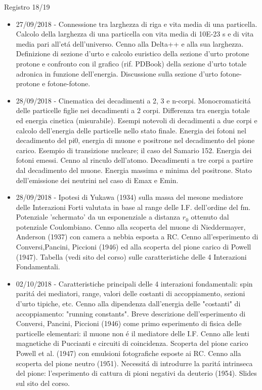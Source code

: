 \begin{frame}[allowframebreaks]{Registro 18/19}
\begin{itemize}
\item 27/09/2018 - Connessione tra larghezza di riga e vita media di una particella. Calcolo della larghezza di una particella con vita media di 10E-23 s e di vita media pari all'et\'a dell'universo. Cenno alla Delta++ e alla sua larghezza. Definizione di sezione d'urto e calcolo euristico della sezione d'urto protone protone e confronto con il grafico (rif. PDBook) della sezione d’urto totale adronica in funzione dell’energia. Discussione sulla sezione d’urto fotone-protone e fotone-fotone.
\item 28/09/2018 - Cinematica dei decadimenti a 2, 3 e n-corpi. Monocromaticit\'a delle particelle figlie nei decadimenti a 2 corpi. Differenza tra energia totale ed energia cinetica (misurabile). Esempi notevoli di decadimenti a due corpi e calcolo dell'energia delle particelle nello stato finale. Energia dei fotoni nel decadimento del pi0, energia di muone e positrone nel decadimento del pione carico. Esempio di transizione nucleare; il caso del Samario 152. Energia dei fotoni emessi. Cenno al rinculo dell'atomo. Decadimenti a tre corpi a partire dal decadimento del muone. Energia massima e minima del positrone. Stato dell'emissione dei neutrini nel caso di Emax e Emin.
\item 28/09/2018 - Ipotesi di Yukawa (1934) sulla massa del mesone mediatore delle Interazioni Forti valutata in base al range delle I.F. dell'ordine del fm. Potenziale 'schermato' da un esponenziale a distanza $r_0$ ottenuto dal potenziale Coulombiano. Cenno alla scoperta del muone di Nieddermayer, Anderson (1937) con camera a nebbia esposta a RC. Cenno all'esperimento di Conversi,Pancini, Piccioni (1946) ed alla scoperta del pione carico di Powell (1947). Tabella (vedi sito del corso) sulle caratteristiche delle 4 Interazioni Fondamentali.
\item 02/10/2018 - Caratteristiche principali delle 4 interazioni fondamentali: spin parit\'a dei mediatori, range, valori delle costanti di accoppiamento, sezioni d'urto tipiche, etc. Cenno alla dipendenza dall'energia delle "costanti" di accoppiamento: "running constants". Breve descrizione dell'esperimento di Conversi, Pancini, Piccioni (1946) come primo esperimento di fisica delle particelle elementari: il muone non \'e il mediatore delle I.F. Cenno alle lenti magnetiche di Puccianti e circuiti di coincidenza. Scoperta del pione carico Powell et al. (1947) con emulsioni fotografiche esposte ai RC. Cenno alla scoperta del pione neutro (1951). Necessit\'a di introdurre la parit\'a intrinseca del pione: l'esperimento di cattura di pioni negativi da deuterio (1954). Slides sul sito del corso.

\end{itemize}
\end{frame}
